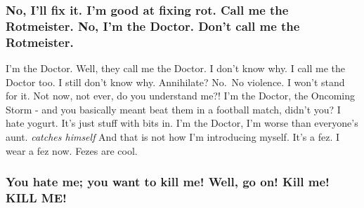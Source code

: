\documentclass[
]{report}
\begin{document}
\hypertarget{no-ill-fix-it.-im-good-at-fixing-rot.-call-me-the-rotmeister.-no-im-the-doctor.-dont-call-me-the-rotmeister.}{%
\subsubsection{No, I'll fix it. I'm good at fixing rot. Call me the
Rotmeister. No, I'm the Doctor. Don't call me the
Rotmeister.}\label{no-ill-fix-it.-im-good-at-fixing-rot.-call-me-the-rotmeister.-no-im-the-doctor.-dont-call-me-the-rotmeister.}}

I'm the Doctor. Well, they call me the Doctor. I don't know why. I call
me the Doctor too. I still don't know why. Annihilate? No.~No violence.
I won't stand for it. Not now, not ever, do you understand me?! I'm the
Doctor, the Oncoming Storm - and you basically meant beat them in a
football match, didn't you? I hate yogurt. It's just stuff with bits in.
I'm the Doctor, I'm worse than everyone's aunt. \emph{catches himself}
And that is not how I'm introducing myself. It's a fez. I wear a fez
now. Fezes are cool.

\hypertarget{you-hate-me-you-want-to-kill-me-well-go-on-kill-me-kill-me}{%
\subsubsection{You hate me; you want to kill me! Well, go on! Kill me!
KILL
ME!}\label{you-hate-me-you-want-to-kill-me-well-go-on-kill-me-kill-me}}
\end{document}
